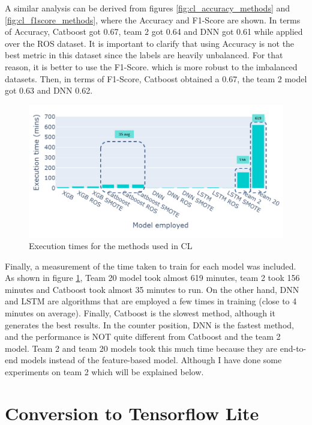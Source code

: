 A similar analysis can be derived from figures \ref{fig:cl_accuracy_methods} and \ref{fig:cl_f1score_methods}, where the Accuracy and F1-Score are shown. In terms of Accuracy, Catboost got 0.67, team 2 got 0.64 and DNN got 0.61 while applied over the ROS dataset. It is important to clarify that using Accuracy is not the best metric in this dataset since the labels are heavily unbalanced. For that reason, it is better to use the F1-Score. which is more robust to the imbalanced datasets. Then, in terms of F1-Score, Catboost obtained a 0.67, the team 2 model got 0.63 and DNN 0.62.

\begin{figure}[H]
\centering
\includegraphics[scale=0.58]{img/time_cl_teams.png}
\caption{Execution times for the methods used in CL}
\label{fig:times_cl}
\end{figure}

Finally, a measurement of the time taken to train for each model was included. As shown in figure \ref{fig:times_cl}, Team 20 model took almost 619 minutes, team 2 took 156 minutes and Catboost took almost 35 minutes to run. On the other hand, DNN and LSTM are algorithms that are employed a few times in training (close to 4 minutes on average). Finally, Catboost is the slowest method, although it generates the best results. In the counter position, DNN is the fastest method, and the performance is NOT quite different from Catboost and the team 2 model. Team 2 and team 20 models took this much time because they are end-to-end models instead of the feature-based model. Although I have done some experiments on team 2 which will be explained below. 


\section{Conversion to Tensorflow Lite } \label{5CTL}

